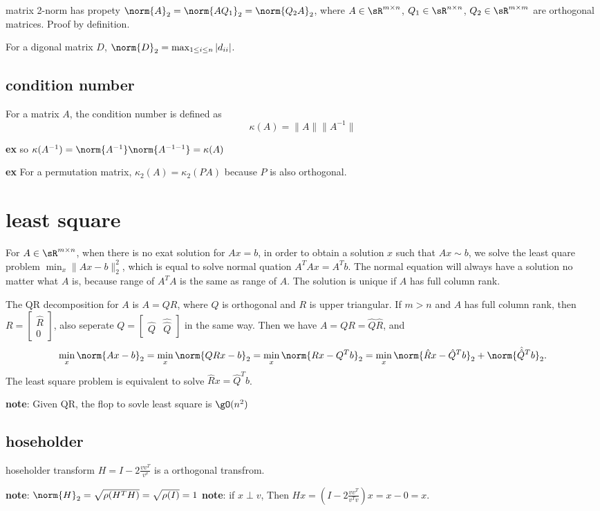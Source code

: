 \documentclass{article}%
\begin{document}
matrix 2-norm has propety $\norm{A}_2=\norm{AQ_1}_2=\norm{Q_2A}_2$, where $A\in \sR^{m\times n}$, $Q_1\in \sR^{n\times n}$, $Q_2\in \sR^{m\times m}$ are orthogonal matrices. Proof by definition.

For a digonal matrix $D$, $\norm{D}_2=\max_{1\leq i\leq n}|d_{ii}|$.

\subsection{condition number}
For a matrix $A$, the condition number is defined as
$$
\kappa(A)=\|A\|\|A^{-1}\|
$$

\textbf{ex} so $\kappa(A^{-1})=\norm{A^{-1}}\norm{A^{-1-1}}=\kappa(A)$

\textbf{ex} For a permutation matrix, $\kappa_2(A)=\kappa_2(PA)$ because $P$ is also orthogonal.




\section{least square}

For $A\in\sR^{m\times n}$, when there is no exat solution for $Ax=b$, in order to obtain a solution  $x$ such that $Ax\sim b$, we solve the least quare problem $\min_x\|Ax-b\|_2^2$, which is equal to solve normal quation $A^TAx=A^Tb$. The normal equation will always have a solution no matter what $A$ is, because range of $A^TA$ is the same as range of $A$. The solution is unique if $A$ has full column rank.

The QR decomposition for $A$ is $A=QR$, where $Q$ is orthogonal and $R$ is upper triangular. If $m>n$ and $A$ has full column rank, then $
R=\begin{bmatrix}
    \hat{R}\\
    0
\end{bmatrix}$, also seperate $Q=\begin{bmatrix}
    \hat{Q}&\hat{\hat{Q}}
\end{bmatrix}$ in the same way. Then we have $A=QR=\hat{Q}\hat{R}$, and
$$\min_x\norm{Ax-b}_2=\min_x\norm{QRx-b}_2=\min_x\norm{Rx-Q^Tb}_2=\min_x\norm{\hat{R}x-\hat{Q}^Tb}_2+\norm{\hat{\hat{Q}}^Tb}_2.$$ The least square problem is equivalent to solve $\hat{R}x=\hat{Q}^Tb$.

\textbf{note}: Given QR, the flop to sovle least square is $\gO(n^2)$



\subsection{hoseholder}
hoseholder transform $H=I-2\frac{vv^T}{v^v}$ is a orthogonal transfrom.

\textbf{note}: $\norm{H}_2=\sqrt{\rho(H^TH)}=\sqrt{\rho(I)}=1$
\textbf{note}: if $x\perp v$, Then $Hx=(I-2\frac{vv^T}{v^Tv})x=x-0=x$.
\end{document}
